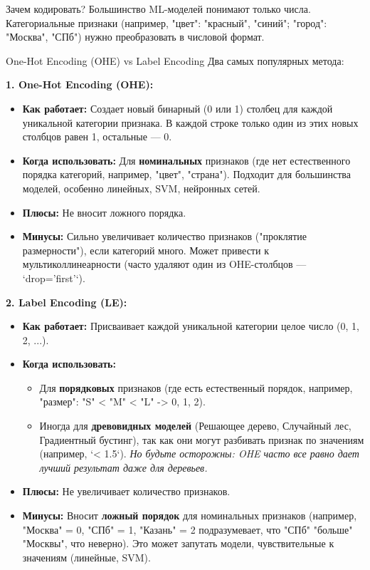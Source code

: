 \begin{myblock}{Зачем кодировать?}
    Большинство ML-моделей понимают только числа. Категориальные признаки (например, "цвет": "красный", "синий"; "город": "Москва", "СПб") нужно преобразовать в числовой формат.
\end{myblock}

\begin{textbox}{One-Hot Encoding (OHE) vs Label Encoding}
    Два самых популярных метода:

    \textbf{1. One-Hot Encoding (OHE):}
    \begin{itemize}
        \item \textbf{Как работает:} Создает новый бинарный (0 или 1) столбец для каждой уникальной категории признака. В каждой строке только один из этих новых столбцов равен 1, остальные — 0.
        \item \textbf{Когда использовать:} Для \textbf{номинальных} признаков (где нет естественного порядка категорий, например, "цвет", "страна"). Подходит для большинства моделей, особенно линейных, SVM, нейронных сетей.
        \item \textbf{Плюсы:} Не вносит ложного порядка.
        \item \textbf{Минусы:} Сильно увеличивает количество признаков ("проклятие размерности"), если категорий много. Может привести к мультиколлинеарности (часто удаляют один из OHE-столбцов — `drop='first'`).
    \end{itemize}

    \textbf{2. Label Encoding (LE):}
    \begin{itemize}
        \item \textbf{Как работает:} Присваивает каждой уникальной категории целое число (0, 1, 2, ...).
        \item \textbf{Когда использовать:}
            \begin{itemize}
                \item Для \textbf{порядковых} признаков (где есть естественный порядок, например, "размер": "S" < "M" < "L" -> 0, 1, 2).
                \item Иногда для \textbf{древовидных моделей} (Решающее дерево, Случайный лес, Градиентный бустинг), так как они могут разбивать признак по значениям (например, `< 1.5`). \textit{Но будьте осторожны: OHE часто все равно дает лучший результат даже для деревьев.}
            \end{itemize}
        \item \textbf{Плюсы:} Не увеличивает количество признаков.
        \item \textbf{Минусы:} Вносит \textbf{ложный порядок} для номинальных признаков (например, "Москва" = 0, "СПб" = 1, "Казань" = 2 подразумевает, что "СПб" "больше" "Москвы", что неверно). Это может запутать модели, чувствительные к значениям (линейные, SVM).
    \end{itemize}


\end{textbox}
